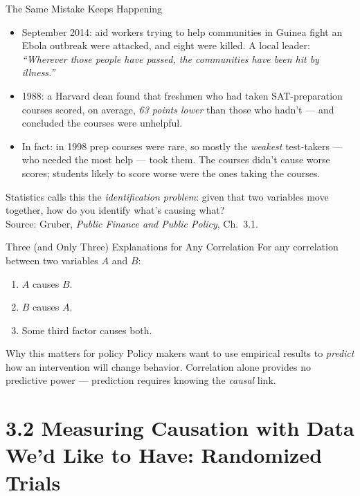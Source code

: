 \documentclass[11pt,aspectratio=169]{beamer}
\newcommand{\srcnote}[1]{{\footnotesize\color{wugray}Source: #1}}
\begin{document}
\begin{frame}{The Same Mistake Keeps Happening}
  \begin{itemize}
    \item September 2014: aid workers trying to help communities in Guinea fight an Ebola outbreak were attacked, and eight were killed. A local leader: \emph{``Wherever those people have passed, the communities have been hit by illness.''}
    \item 1988: a Harvard dean found that freshmen who had taken SAT-preparation courses scored, on average, \emph{63 points lower} than those who hadn't --- and concluded the courses were unhelpful.
    \item In fact: in 1998 prep courses were rare, so mostly the \emph{weakest} test-takers --- who needed the most help --- took them. The courses didn't cause worse scores; students likely to score worse were the ones taking the courses.
  \end{itemize}
  \vspace{0.3em}
  \centering
  \alert{Statistics calls this the \emph{identification problem}: given that two variables move together, how do you identify what's causing what?}\\
  \srcnote{Gruber, \emph{Public Finance and Public Policy}, Ch.\ 3.1.}
\end{frame}

\begin{frame}{Three (and Only Three) Explanations for Any Correlation}
  For any correlation between two variables $A$ and $B$:
  \begin{enumerate}
    \item \(A\) causes \(B\).
    \item \(B\) causes \(A\).
    \item Some third factor causes both.
  \end{enumerate}
  \vspace{0.5em}
  \begin{alertblock}{Why this matters for policy}
    Policy makers want to use empirical results to \emph{predict} how an intervention will change behavior. Correlation alone provides no predictive power --- prediction requires knowing the \emph{causal} link.
  \end{alertblock}
\end{frame}

\section{3.2 Measuring Causation with Data We'd Like to Have: Randomized Trials}
\end{document}
